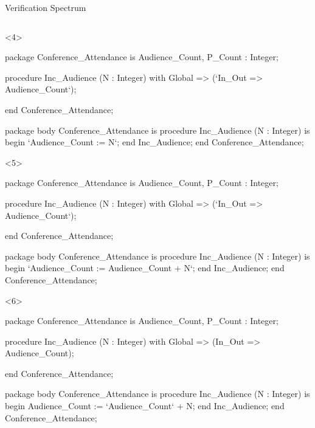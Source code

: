 \documentclass{beamer}
\begin{document}
\begin{frame}[fragile]{Verification Spectrum}
\begin{columns}
\begin{column}{9cm}
      \begin{onlyenv}<4>
      \begin{pxcode}[language=SPARK,style=magic,gobble=8]
        package Conference_Attendance
        is
           Audience_Count, P_Count : Integer;

           procedure Inc_Audience (N : Integer)
           with Global => (`In_Out => Audience_Count`);

        end Conference_Attendance;

        package body Conference_Attendance
        is
           procedure Inc_Audience (N : Integer)
           is
           begin
              `Audience_Count := N`;
           end Inc_Audience;
        end Conference_Attendance;
      \end{pxcode}
      \end{onlyenv}

      \begin{onlyenv}<5>
      \begin{pxcode}[language=SPARK,style=magic,gobble=8]
        package Conference_Attendance
        is
           Audience_Count, P_Count : Integer;

           procedure Inc_Audience (N : Integer)
           with Global => (`In_Out => Audience_Count`);

        end Conference_Attendance;

        package body Conference_Attendance
        is
           procedure Inc_Audience (N : Integer)
           is
           begin
              `Audience_Count := Audience_Count + N`;
           end Inc_Audience;
        end Conference_Attendance;
      \end{pxcode}
      \end{onlyenv}


      \begin{onlyenv}<6>
      \begin{pxcode}[language=SPARK,style=magic,gobble=8]
        package Conference_Attendance
        is
           Audience_Count, P_Count : Integer;

           procedure Inc_Audience (N : Integer)
           with Global => (In_Out => Audience_Count);

        end Conference_Attendance;

        package body Conference_Attendance
        is
           procedure Inc_Audience (N : Integer)
           is
           begin
              Audience_Count := `Audience_Count` + N;
           end Inc_Audience;
        end Conference_Attendance;
      \end{pxcode}
      \end{onlyenv}


\end{column}
\end{columns}
\end{frame}
\end{document}
